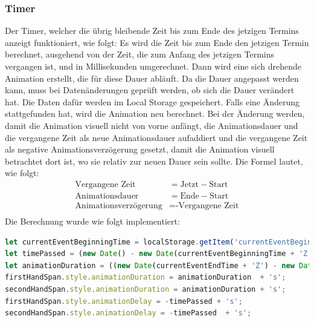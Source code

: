 \subsubsection{Timer}
Der Timer, welcher die übrig bleibende Zeit bis zum Ende des jetzigen Termins anzeigt funktioniert, wie folgt:
\newline
\newline
Es wird die Zeit bis zum Ende den jetzigen Termin berechnet, ausgehend von der Zeit, die zum Anfang des jetzigen Termins vergangen ist, und in Millisekunden umgerechnet.
Dann wird eine sich drehende Animation erstellt, die für diese Dauer abläuft.
\newline
Da die Dauer angepasst werden kann, muss bei Datenänderungen geprüft werden, ob sich die Dauer verändert hat.
Die Daten dafür werden im Local Storage gespeichert.
Falls eine Änderung stattgefunden hat, wird die Animation neu berechnet.
Bei der Änderung werden, damit die Animation visuell nicht von vorne anfängt, die Animationsdauer und die vergangene Zeit als neue Animationsdauer aufaddiert und die vergangene Zeit als negative Animationsverzögerung gesetzt, damit die Animation visuell betrachtet dort ist, wo sie relativ zur neuen Dauer sein sollte.
\newline
\newline
Die Formel lautet, wie folgt:
\newline
\newline
\begin{equation}
\begin{aligned}
    \text{Vergangene Zeit} &= \text{Jetzt} - \text{Start} \\
\text{Animationsdauer} &= \text{Ende} - \text{Start} \\
    \text {Animationsverzögerung} &= \text{-Vergangene Zeit} \\
\end{aligned}
\end{equation}
\newline
\newline
Die Berechnung wurde wie folgt implementiert:
\newline
\newline
\begin{lstlisting}[language=javascript,label={lst:JavaScript Timer}]
let currentEventBeginningTime = localStorage.getItem('currentEventBeginningTime');
let timePassed = (new Date() - new Date(currentEventBeginningTime + 'Z')) / 1000;
let animationDuration = ((new Date(currentEventEndTime + 'Z') - new Date(currentEventBeginningTime + 'Z')) / 1000);
firstHandSpan.style.animationDuration = animationDuration  + 's';
secondHandSpan.style.animationDuration = animationDuration + 's';
firstHandSpan.style.animationDelay = -timePassed + 's';
secondHandSpan.style.animationDelay = -timePassed  + 's';
\end{lstlisting}
